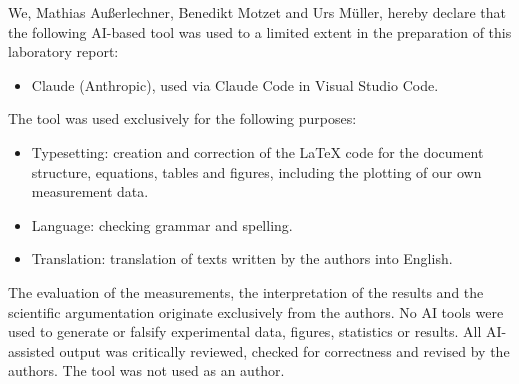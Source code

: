 \documentclass[state=Report]{mcidoc}
\begin{document}
We, Mathias Außerlechner, Benedikt Motzet and Urs Müller, hereby declare that
the following AI-based tool was used to a limited extent in the preparation of
this laboratory report:

\begin{itemize}
  \item Claude (Anthropic), used via Claude Code in Visual Studio Code.
\end{itemize}

\noindent
The tool was used exclusively for the following purposes:

\begin{itemize}
  \item Typesetting: creation and correction of the \LaTeX{} code for the
    document structure, equations, tables and figures, including the plotting
    of our own measurement data.
  \item Language: checking grammar and spelling.
  \item Translation: translation of texts written by the authors into English.
\end{itemize}

\noindent
The evaluation of the measurements, the interpretation of the results and the
scientific argumentation originate exclusively from the authors. No AI tools
were used to generate or falsify experimental data, figures, statistics or
results. All AI-assisted output was critically reviewed, checked for
correctness and revised by the authors. The tool was not used as an author.

\appendix

\end{document}
